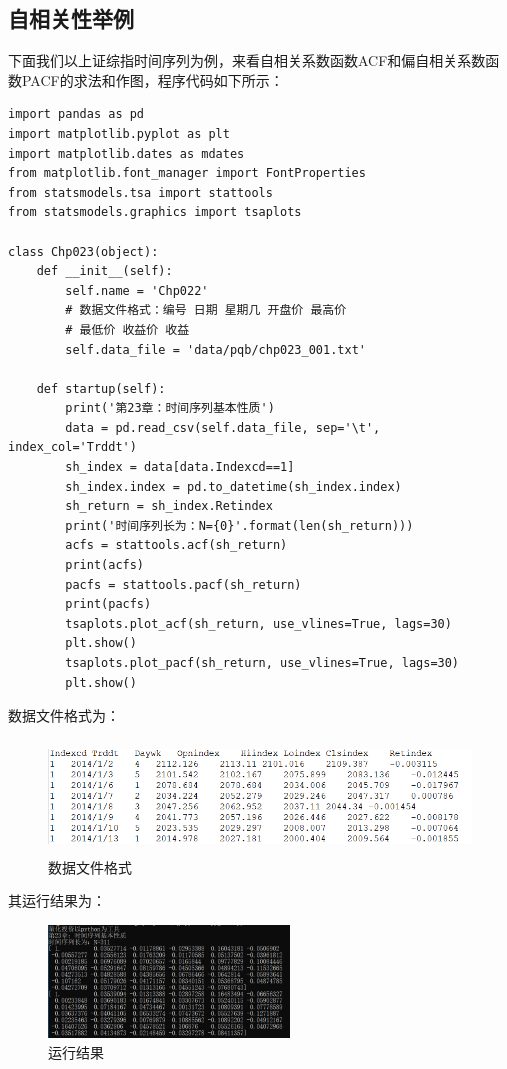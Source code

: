 \documentclass{article}
\begin{document}
\subsection{自相关性举例}
下面我们以上证综指时间序列为例，来看自相关系数函数ACF和偏自相关系数函数PACF的求法和作图，程序代码如下所示：
\begin{lstlisting}
import pandas as pd
import matplotlib.pyplot as plt
import matplotlib.dates as mdates
from matplotlib.font_manager import FontProperties
from statsmodels.tsa import stattools
from statsmodels.graphics import tsaplots

class Chp023(object):
    def __init__(self):
        self.name = 'Chp022'
        # 数据文件格式：编号 日期 星期几 开盘价 最高价 
        # 最低价 收益价 收益
        self.data_file = 'data/pqb/chp023_001.txt'
        
    def startup(self):
        print('第23章：时间序列基本性质')
        data = pd.read_csv(self.data_file, sep='\t', index_col='Trddt')
        sh_index = data[data.Indexcd==1]
        sh_index.index = pd.to_datetime(sh_index.index)
        sh_return = sh_index.Retindex
        print('时间序列长为：N={0}'.format(len(sh_return)))
        acfs = stattools.acf(sh_return)
        print(acfs)
        pacfs = stattools.pacf(sh_return)
        print(pacfs)
        tsaplots.plot_acf(sh_return, use_vlines=True, lags=30)
        plt.show()
        tsaplots.plot_pacf(sh_return, use_vlines=True, lags=30)
        plt.show()
\end{lstlisting}
数据文件格式为：
\begin{figure}[H]
	\caption{数据文件格式}
	\label{f000001}
	\centering
	\includegraphics[height=3cm]{images/f000001}
\end{figure}
其运行结果为：
\begin{figure}[H]
	\caption{运行结果}
	\label{f000002}
	\centering
	\includegraphics[height=3cm]{images/f000002}
\end{figure}
\end{document}

